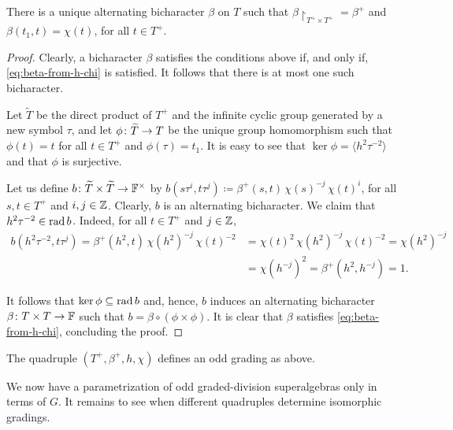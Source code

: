 \begin{lemma}\label{lemma:existence-beta}
    There is a unique alternating bicharacter $\beta$ on $T$ such that $\beta\restriction_{T^+ \times T^+} = \beta^+$ and $\beta(t_1, t) = \chi(t)$, for all $t\in T^+$.
\end{lemma}

\begin{proof}
    Clearly, a bicharacter $\beta$ satisfies the conditions above if, and only if, \cref{eq:beta-from-h-chi} is satisfied. 
    It follows that there is at most one such bicharacter. 
    
    
    Let $\widetilde T$ be the direct product of $T^+$ and the infinite cyclic group generated by a new symbol $\tau$, and let $\phi \colon \widetilde T \to T$ be the unique group homomorphism such that $\phi(t) = t$ for all $t\in T^+$ and $\phi(\tau) = t_1$. 
    It is easy to see that $\ker \phi = \langle h^2 \tau^{-2} \rangle$ and that $\phi$ is surjective. 
    
    Let us define $b\colon \widetilde T\times \widetilde T \rightarrow \mathbb{F}^\times$ by $b(s\tau^i,t\tau^j) \coloneqq \beta^+(s,t)\, \chi (s)^{-j}\, \chi (t)^i$, for all $s,t\in T^+$ and $i,j \in \mathbb{Z}$. 
    Clearly, $b$ is an alternating bicharacter. 
    We claim that $h^2 \tau^{-2} \in \operatorname{rad} b$. 
    Indeed, for all $t \in T^+$ and $j \in \mathbb{Z}$,
    \begin{align}
        b(h^2 \tau^{-2},t\tau^j) = \beta^+(h^2,t)\, \chi (h^2)^{-j}\, \chi (t)^{-2} &= \chi (t)^{2}\, \chi (h^2)^{-j}\, \chi (t)^{-2} = \chi (h^2)^{-j} \\
        &= \chi (h^{-j})^2 = \beta^+(h^2,h^{-j}) = 1.
    \end{align}
    
    It follows that $\ker \phi \subseteq \operatorname{rad} b$ and, hence, $b$ induces an alternating bicharacter $\beta\colon T\times T \to \mathbb{F}$ such that $b = \beta \circ (\phi \times \phi)$. 
    It is clear that $\beta$ satisfies \cref{eq:beta-from-h-chi}, concluding the proof.
\end{proof}

\begin{defi}
    The quadruple $(T^+, \beta^+, h, \chi)$ defines an odd grading as above. 
\end{defi}

We now have a parametrization of odd graded-division superalgebras only in terms of $G$. 
It remains to see when different quadruples determine isomorphic gradings.


